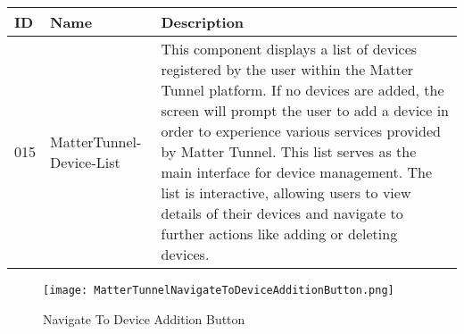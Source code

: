 \documentclass[conference]{IEEEtran}
\begin{document}
\begin{enumerate}[itemsep=2ex, parsep=1ex]
\begin{enumerate}[itemsep=2ex, parsep=1ex]
	      	      \begin{table}[h!]
	      	      	\def\arraystretch{1.24} \small
	      	      	\begin{tabular}{|p{1.2cm}|p{2.5cm}|p{4.0cm}|}
	      	      		\hline
	      	      		ID  & Name                     & Description                                                                                                                                                                                                                                                                                                                                                                                                                                             \\
	      	      		\hline
	      	      		015 & MatterTunnel-Device-List & This component displays a list of devices registered by the user within the Matter Tunnel platform. If no devices are added, the screen will prompt the user to add a device in order to experience various services provided by Matter Tunnel. This list serves as the main interface for device management. The list is interactive, allowing users to view details of their devices and navigate to further actions like adding or deleting devices. \\
	      	      		\hline
	      	      	\end{tabular}
	      	      \end{table}

                  \vspace{7cm}
	      	      
	      	      \begin{figure}[h!]
	      	      	\centering
	      	      	\texttt{[image: MatterTunnelNavigateToDeviceAdditionButton.png]}
	      	      	\caption{Navigate To Device Addition Button}
	      	      	\label{fig:MatterTunnelNavigateToDeviceAdditionButton}
	      	      \end{figure}
	      	                        

\end{enumerate}
\end{enumerate}
\end{document}
